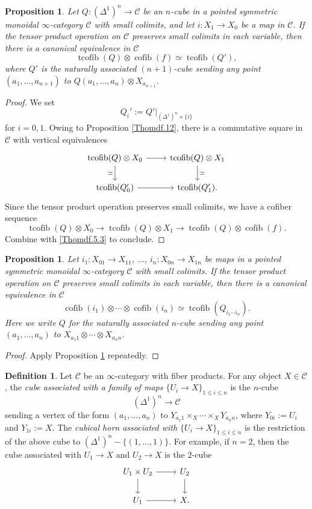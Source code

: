 \documentclass[11pt, a4paper]{amsart}
\newtheorem{prop}[thm]{Proposition}
\theoremstyle{definition}
\newtheorem{df}[thm]{Definition}
\numberwithin{equation}{subsection}
\newcommand{\cC}{\mathcal{C}}
\newcommand{\cofib}{\operatorname{cofib}}
\newcommand{\tcofib}{\operatorname{tcofib}}
\begin{document}
\begin{prop}
\label{Thomdf.11}
Let $Q\colon (\Delta^1)^n \to \cC$ be an $n$-cube in a pointed symmetric monoidal $\infty$-category $\cC$ with small colimits, 
and let $i\colon X_1\to X_0$ be a map in $\cC$.
If the tensor product operation on $\cC$ preserves small colimits in each variable, then there is a canonical equivalence in $\cC$
\[
\tcofib(Q) \otimes \cofib(f)
\simeq
\tcofib(Q'),
\]
where $Q'$ is the naturally associated $(n+1)$-cube sending any point $(a_1,\ldots,a_{n+1})$ to 
$Q(a_1,\ldots,a_n)\otimes X_{a_{n+1}}$.
\end{prop}
\begin{proof}
We set
\[
Q_i':=Q'|_{(\Delta^1)^n \times \{i\}}
\]
for $i=0,1$.
Owing to Proposition \ref{Thomdf.12}, there is a commutative square in $\cC$ with vertical equivalences
\[
\begin{tikzcd}
\tcofib(Q)\otimes X_0\ar[d,"\simeq"']\ar[r]&
\tcofib(Q)\otimes X_1\ar[d,"\simeq"]
\\
\tcofib(Q_0')\ar[r]&
\tcofib(Q_1').
\end{tikzcd}
\]
Since the tensor product operation preserves small colimits, we have a cofiber sequence
\[
\tcofib(Q)\otimes X_0\to \tcofib(Q)\otimes X_1\to \tcofib(Q)\otimes \cofib(f).
\]
Combine with \eqref{Thomdf.5.3} to conclude.
\end{proof}

\begin{prop}
\label{Thomdf.6}
Let $i_1\colon X_{01}\to X_{11}$, $\ldots$, $i_n\colon X_{0n}\to X_{1n}$ be maps in a pointed symmetric monoidal 
$\infty$-category $\cC$ with small colimits.
If the tensor product operation on $\cC$ preserves small colimits in each variable, 
then there is a canonical equivalence in $\cC$
\[
\cofib(i_1)\otimes \cdots \otimes \cofib(i_n)
\simeq
\tcofib(Q_{i_1\cdots i_n}).
\]
Here we write $Q$ for the naturally associated $n$-cube sending any point $(a_1,\ldots,a_n)$ to 
$X_{a_1 1}\otimes \cdots \otimes X_{a_n n}$.
\end{prop}
\begin{proof}
Apply Proposition \ref{Thomdf.11} repeatedly.
\end{proof}

\begin{df}
\label{Thomdf.9}
Let $\cC$ be an $\infty$-category with fiber products.
For any object $X\in \cC$, 
the \emph{cube associated with a family of maps $\{U_i\to X\}_{1\leq i\leq n}$} 
 is the $n$-cube
\[
(\Delta^1)^n\to \cC
\]
sending a vertex of the form $(a_1,\ldots,a_n)$ to $Y_{a_1 1}\times_X \cdots \times_X Y_{a_n n}$, 
where $Y_{0i}:=U_i$ and $Y_{1i}:=X$.
The \emph{cubical horn associated with $\{U_i\to X\}_{1\leq i\leq n}$}  
is the restriction of the above cube to $(\Delta^1)^n-\{(1,\ldots,1)\}$.
For example, if $n=2$, then the cube associated with $U_1\to X$ and $U_2\to X$ is the $2$-cube
\[
\begin{tikzcd}
U_1\times U_2\ar[r]\ar[d]&U_2\ar[d]
\\
U_1\ar[r]&X.
\end{tikzcd}
\]
\end{df}
\end{document}
